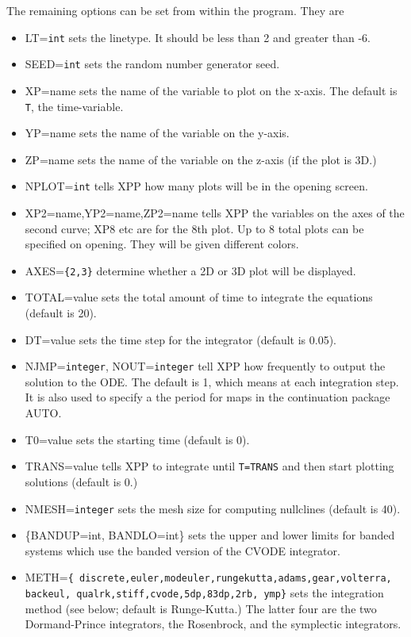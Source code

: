 \documentclass{article}
\begin{document}
The remaining options can be set from within the program. They are 
\begin{itemize}
\item LT={\tt int} sets the linetype. It should be less than 2 and
greater than -6. 
\item SEED={\tt int} sets the random number generator seed. 
 \item XP=name sets the name of the variable to plot on the x-axis.
The default is {\tt T}, the time-variable.
\item YP=name sets the name of the variable on the y-axis.
\item ZP=name sets the name of the variable on the z-axis (if the plot
is 3D.) 
\item NPLOT={\tt int} tells XPP how many plots will be in the opening
screen. 
\item XP2=name,YP2=name,ZP2=name tells XPP the variables on the axes
of the second curve; XP8 etc are for the 8th plot. Up to 8 total plots
can be specified on opening. They will be given different colors.  
\item AXES={\tt \{2,3\}} determine whether a 2D or 3D plot will be
displayed.
\item TOTAL=value sets the total amount of time to integrate the
equations (default is 20).
\item DT=value sets the time step for the integrator (default is 0.05).
\item NJMP={\tt integer}, NOUT={\tt integer}
 tell XPP how frequently to output the
solution to the ODE.  The default is 1, which means at each
integration step. It is also used to specify a the period for maps in
the continuation package AUTO.
\item T0=value sets the starting time (default is 0). 
\item TRANS=value tells XPP to integrate until {\tt T=TRANS} and then
start plotting solutions (default is 0.)
\item NMESH={\tt integer} sets the mesh size for computing nullclines
(default is 40).
\item \{BANDUP=int, BANDLO=int\} sets the upper and lower limits for
banded systems which use the banded version of the CVODE integrator.
\item METH={\tt \{
discrete,euler,modeuler,rungekutta,adams,gear,volterra, backeul,
qualrk,stiff,cvode,5dp,83dp,2rb, ymp\}}
sets the integration method (see below; default is Runge-Kutta.) The
latter four are the two Dormand-Prince integrators, the Rosenbrock, 
and the symplectic integrators.  

\end{itemize}
\end{document}
